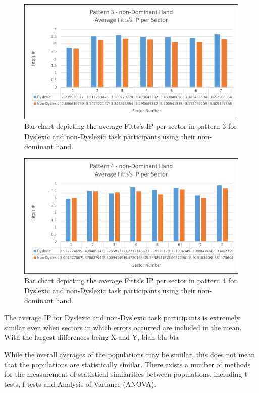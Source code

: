 	\begin{figure}[]
		\centering
		\includegraphics[width = \textwidth]{../images/pat_3_ip_ndom}
		\caption{Bar chart depicting the average Fitts's IP per sector in pattern 3 for Dyslexic and non-Dyslexic task participants using their non-dominant hand.}
		\label{fi_pat_3_ip_ndom}
	\end{figure}		
	
	\begin{figure}[]
		\centering
		\includegraphics[width = \textwidth]{../images/pat_4_ip_ndom}
		\caption{Bar chart depicting the average Fitts's IP per sector in pattern 4 for Dyslexic and non-Dyslexic task participants using their non-dominant hand.}
		\label{fi_pat_4_ip_ndom}
	\end{figure}
			
		The average IP for Dyslexic and non-Dyslexic task participants is extremely similar even when sectors in which errors occurred are included in the mean. With the largest differences being X and Y, blah bla bla

		While the overall averages of the populations may be similar, this does not mean that the populations are statistically similar. There exists a number of methods for the measurement of statistical similarities between populations, including t-tests, f-tests and Analysis of Variance (ANOVA).


